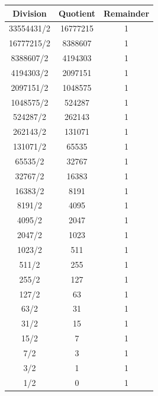 \documentclass[main.tex]{subfiles}
\begin{document}
\begin{enumerate}
\begin{enumerate}
\begin{enumerate}
        \begin{center}
        \begin{tabular}{ |c c c| } 
            \hline
            Division & Quotient & Remainder\\  
            \hline\hline
            33554431/2 & 16777215 & 1 \\ 
            \hline
            16777215/2 & 8388607 & 1 \\ 
            \hline
            8388607/2 & 4194303 & 1 \\ 
            \hline
            4194303/2 & 2097151 & 1 \\ 
            \hline
            2097151/2 & 1048575 & 1 \\ 
            \hline
            1048575/2 & 524287 & 1 \\ 
            \hline
            524287/2 & 262143 & 1 \\ 
            \hline
            262143/2 & 131071 & 1 \\ 
            \hline
            131071/2 & 65535 & 1 \\ 
            \hline
            65535/2 & 32767 & 1 \\ 
            \hline
            32767/2 & 16383 & 1 \\ 
            \hline
            16383/2 & 8191 & 1 \\ 
            \hline
            8191/2 & 4095 & 1 \\ 
            \hline
            4095/2 & 2047 & 1 \\ 
            \hline
            2047/2 & 1023 & 1 \\ 
            \hline
            1023/2 & 511 & 1 \\ 
            \hline
            511/2 & 255 & 1 \\ 
            \hline
            255/2 & 127 & 1 \\ 
            \hline
            127/2 & 63 & 1 \\ 
            \hline
            63/2 & 31 & 1 \\ 
            \hline
            31/2 & 15 & 1 \\ 
            \hline
            15/2 & 7 & 1 \\ 
            \hline
            7/2 & 3 & 1 \\ 
            \hline
            3/2 & 1 & 1 \\ 
            \hline
            1/2 & 0 & 1 \\ 
            \hline
        \end{tabular}
        \end{center}
        

\end{enumerate}
\end{enumerate}
\end{enumerate}
\end{document}
